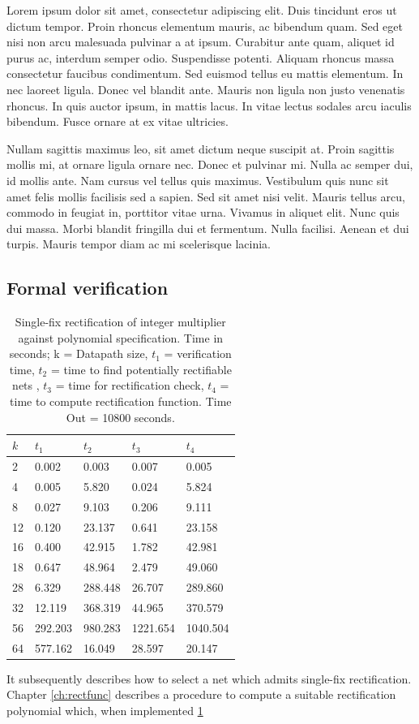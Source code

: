 Lorem ipsum dolor sit amet, consectetur adipiscing elit. Duis tincidunt eros ut dictum tempor. Proin rhoncus elementum mauris, ac bibendum quam. Sed eget nisi non arcu malesuada pulvinar a at ipsum. Curabitur ante quam, aliquet id purus ac, interdum semper odio. Suspendisse potenti. Aliquam rhoncus massa consectetur faucibus condimentum. Sed euismod tellus eu mattis elementum. In nec laoreet ligula. Donec vel blandit ante. Mauris non ligula non justo venenatis rhoncus. In quis auctor ipsum, in mattis lacus. In vitae lectus sodales arcu iaculis bibendum. Fusce ornare at ex vitae ultricies.

Nullam sagittis maximus leo, sit amet dictum neque suscipit at. Proin sagittis mollis mi, at ornare ligula ornare nec. Donec et pulvinar mi. Nulla ac semper dui, id mollis ante. Nam cursus vel tellus quis maximus. Vestibulum quis nunc sit amet felis mollis facilisis sed a sapien. Sed sit amet nisi velit. Mauris tellus arcu, commodo in feugiat in, porttitor vitae urna. Vivamus in aliquet elit. Nunc quis dui massa. Morbi blandit fringilla dui et fermentum. Nulla facilisi. Aenean et dui turpis. Mauris tempor diam ac mi scelerisque lacinia.

\subsection{Formal verification}
\begin{table}[H]
    \centering
    \begin{tabular}{| l | l | l | l | l |}
    \hline
    $k$ & $t_1$ & $t_2$ & $t_3$ & $t_4$ \\ \hline
    2 & 0.002 & 0.003 & 0.007 & 0.005 \\ \hline
    4 & 0.005 & 5.820 & 0.024 & 5.824 \\ \hline
    8 & 0.027 & 9.103 & 0.206 & 9.111 \\ \hline
    12 & 0.120 & 23.137 & 0.641 & 23.158 \\ \hline
    16 & 0.400 & 42.915 & 1.782 & 42.981 \\ \hline
    18 & 0.647 & 48.964 & 2.479 & 49.060  \\ \hline
    28 & 6.329 & 288.448 & 26.707  & 289.860\\ \hline
    32 & 12.119 & 368.319 & 44.965 & 370.579 \\ \hline
    56 & 292.203 & 980.283 & 1221.654 & 1040.504 \\ \hline
    64 & 577.162 & 16.049 & 28.597 & 20.147 \\
    \hline
    \end{tabular}
    \caption{Single-fix rectification of integer multiplier against polynomial specification. Time in seconds; k = Datapath size, $t_1$ = verification time, $t_2$ = time to find potentially rectifiable nets , $t_3$ = time for rectification check, $t_4$ = time to compute rectification function. Time Out = 10800 seconds.}
    \label{tb:tb1}
\end{table}
It subsequently describes how to select a net which admits single-fix rectification. Chapter \ref{ch:rectfunc} describes a procedure to compute a suitable rectification polynomial which, when implemented \ref{tb:tb1}

